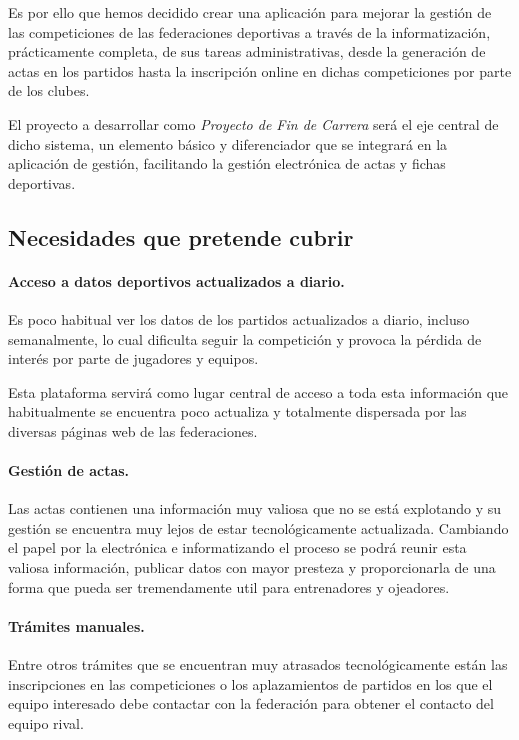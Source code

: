 \documentclass[a4paper,spanish,10p,titlepage]{report}
\begin{document}
    Es por ello que hemos decidido crear una aplicación para mejorar la gestión de las 
competiciones de las federaciones deportivas a través de la informatización, prácticamente 
completa, de sus tareas administrativas, desde la generación de actas en los partidos 
hasta la inscripción online en dichas competiciones por parte de los clubes.
  
    El proyecto a desarrollar como \emph{Proyecto de Fin de Carrera} será el eje 
central de dicho sistema, un elemento básico y diferenciador que se integrará en la 
aplicación de gestión, facilitando la gestión electrónica de actas y fichas deportivas.

  \subsection{Necesidades que pretende cubrir}
  
    \paragraph{Acceso a datos deportivos actualizados a diario.}
    Es poco habitual ver los datos de los partidos actualizados a diario, incluso 
semanalmente, lo 
cual dificulta seguir la competición y provoca la pérdida de interés por parte de 
jugadores y 
equipos.
  
    Esta plataforma servirá como lugar central de acceso a toda esta información que 
habitualmente se encuentra poco actualiza y totalmente dispersada por las diversas 
páginas web de las federaciones.
    
    \paragraph{Gestión de actas.}
    Las actas contienen una información muy valiosa que no se está explotando y su gestión 
se 
encuentra muy lejos de estar tecnológicamente actualizada.
Cambiando el papel por la electrónica e informatizando el proceso se podrá reunir esta 
valiosa información, publicar datos con mayor presteza y proporcionarla de una forma que 
pueda ser tremendamente util para entrenadores y ojeadores.
    
    \paragraph{Trámites manuales.}
    Entre otros trámites que se encuentran muy atrasados tecnológicamente están las 
inscripciones en las competiciones o los aplazamientos de partidos en los que el equipo 
interesado 
debe contactar con la federación para obtener el contacto del equipo rival. 
\end{document}
